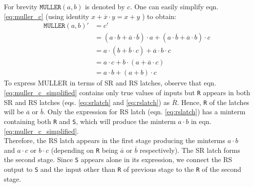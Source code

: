 For brevity $\texttt{MULLER}(a,b)$ is denoted by $c$. 
 One can easily simplify eqn. \ref{eq:muller_c} (using identity $x + \overline{x}
 \cdot y = x + y$ ) to obtain:
\begin{equation}\label{eq:muller_c_simplified}
\begin{split}
	\texttt{MULLER}(a,b)' &= c'\\
	&= (a \cdot b + \overline{a} \cdot \overline{b}) \cdot a 
		+ (a \cdot \overline{b} + \overline{a} \cdot b) \cdot c \\
	&= a \cdot (b + \overline{b} \cdot c) + \overline{a} \cdot b \cdot c \\
	&= a \cdot c + b \cdot (a + \overline{a} \cdot c) \\
	&= a \cdot b + (a + b) \cdot c
\end{split}
\end{equation}
To express MULLER in terms of SR and RS latches, 
observe that eqn. \ref{eq:muller_c_simplified} contains only true values of
inputs but \texttt{R} appears in both SR and RS latches (eqs. \ref{eq:srlatch}
and \ref{eq:rslatch}) as $\overline{R}$. 
Hence, \texttt{R} of the latches will be $\overline{a}$ or $\overline{b}$.
Only the expression for RS latch (eqn. \ref{eq:rslatch}) has a minterm containing both \texttt{R}
and \texttt{S}, which will produce the minterm $ a \cdot b $ in eqn. \ref{eq:muller_c_simplified}.
\\
Therefore, the RS latch appears in the first stage producing the minterms $a
\cdot b$ and $a \cdot c$ or $b \cdot c$ (depending on \texttt{R} being
$\overline{a}$ or $\overline{b}$ respectively). 
The SR latch forms the second stage.
Since \texttt{S} appears alone in its expression, we connect the RS output
to \texttt{S} and the input other than \texttt{R} of previous stage to the
\texttt{R} of the second stage.

